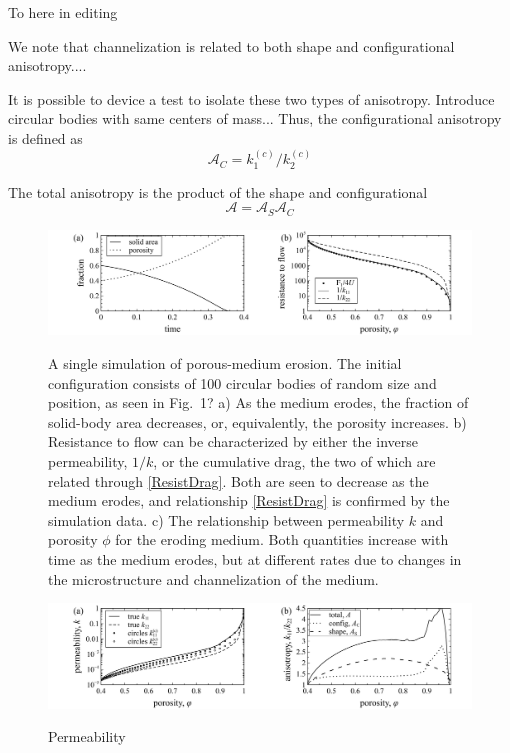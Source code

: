 \documentclass[3p]{elsarticle}
\newcommand{\vsp}[1]{\vspace{#1 pc} \noindent}
\newcommand{\nick}[1]{ {\color{red} #1} }
\newcommand{\anis}{\mathcal{A}}
\begin{document}
\vsp{2} \nick{To here in editing} \vsp{2}


We note that channelization is related to both shape and configurational anisotropy....

It is possible to device a test to isolate these two types of anisotropy.
Introduce circular bodies with same centers of mass...
Thus, the configurational anisotropy is defined as
\begin{equation}
\anis_C = k_1^{(c)} / k_2^{(c)}
\end{equation}

The total anisotropy is the product of the shape and configurational
\begin{equation}
\anis = \anis_S \anis_C
\end{equation}




\begin{figure}%
\centering \label{fig2}
\includegraphics[width = 0.99 \textwidth]{./figs/fig2.pdf}
\caption{A single simulation of porous-medium erosion. The initial configuration consists of 100 circular bodies of random size and position, as seen in Fig.~1? a) As the medium erodes, the fraction of solid-body area decreases, or, equivalently, the porosity increases. b) Resistance to flow can be characterized by either the inverse permeability, $1/k$, or the cumulative drag, the two of which are related through \eqref{ResistDrag}. Both are seen to decrease as the medium erodes, and relationship \eqref{ResistDrag} is confirmed by the simulation data.
c) The relationship between permeability $k$ and porosity $\phi$ for the eroding medium. Both quantities increase with time as the medium erodes, but at different rates due to changes in the microstructure and channelization of the medium.
}
\end{figure}


\begin{figure}%
\centering \label{fig3}
\includegraphics[width = 0.99 \textwidth]{./figs/fig3.pdf}
\caption{
Permeability
}
\end{figure}
\end{document}
